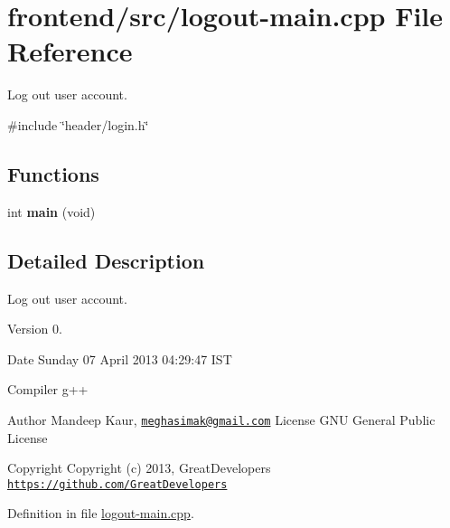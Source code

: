 \hypertarget{logout-main_8cpp}{\section{frontend/src/logout-\/main.cpp \-File \-Reference}
\label{d8/dc7/logout-main_8cpp}
}


\-Log out user account.  


{\ttfamily \#include \char`\"{}header/login.\-h\char`\"{}}\*
\subsection*{\-Functions}
\begin{DoxyCompactItemize}
\item 
\hypertarget{logout-main_8cpp_a840291bc02cba5474a4cb46a9b9566fe}{int {\bfseries main} (void)}\label{d8/dc7/logout-main_8cpp_a840291bc02cba5474a4cb46a9b9566fe}

\end{DoxyCompactItemize}


\subsection{\-Detailed \-Description}
\-Log out user account. \begin{DoxyVersion}{\-Version}
0. 
\end{DoxyVersion}
\begin{DoxyDate}{\-Date}
\-Sunday 07 \-April 2013 04\-:29\-:47 \-I\-S\-T\par
 \-Compiler g++
\end{DoxyDate}
\begin{DoxyAuthor}{\-Author}
\-Mandeep \-Kaur, \href{mailto:meghasimak@gmail.com}{\tt meghasimak@gmail.\-com} \-License \-G\-N\-U \-General \-Public \-License 
\end{DoxyAuthor}
\begin{DoxyCopyright}{\-Copyright}
\-Copyright (c) 2013, \-Great\-Developers \href{https://github.com/GreatDevelopers}{\tt https\-://github.\-com/\-Great\-Developers} 
\end{DoxyCopyright}


\-Definition in file \hyperlink{logout-main_8cpp_source}{logout-\/main.\-cpp}.

